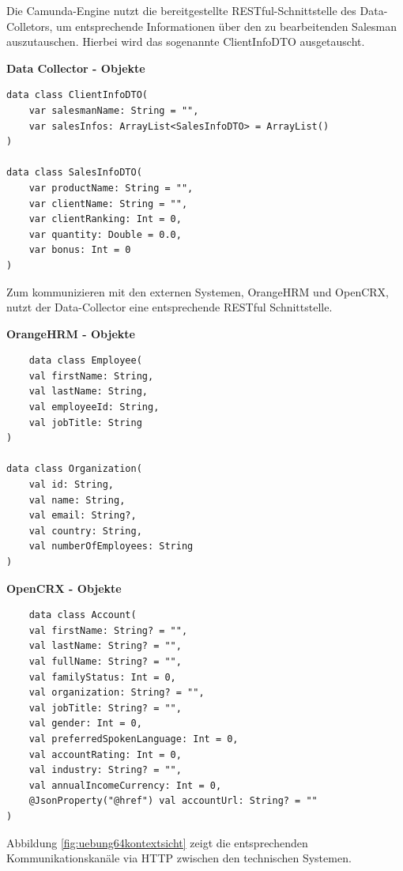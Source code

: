 \documentclass[]{article}
\begin{document}
Die Camunda-Engine nutzt die bereitgestellte RESTful-Schnittstelle des Data-Colletors, um entsprechende Informationen über den zu bearbeitenden Salesman auszutauschen.
Hierbei wird das sogenannte ClientInfoDTO ausgetauscht.

\textbf{Data Collector - Objekte}
\begin{verbatim}
data class ClientInfoDTO(
    var salesmanName: String = "",
    var salesInfos: ArrayList<SalesInfoDTO> = ArrayList()
)

data class SalesInfoDTO(
    var productName: String = "",
    var clientName: String = "",
    var clientRanking: Int = 0,
    var quantity: Double = 0.0,
    var bonus: Int = 0
)
\end{verbatim}

Zum kommunizieren mit den externen Systemen, OrangeHRM und OpenCRX, nutzt der Data-Collector eine entsprechende RESTful Schnittstelle.

\textbf{OrangeHRM - Objekte}
\begin{verbatim}
	data class Employee(
    val firstName: String,
    val lastName: String,
    val employeeId: String,
    val jobTitle: String
)

data class Organization(
    val id: String,
    val name: String,
    val email: String?,
    val country: String,
    val numberOfEmployees: String
)
\end{verbatim}

\textbf{OpenCRX - Objekte}
\begin{verbatim}
	data class Account(
    val firstName: String? = "",
    val lastName: String? = "",
    val fullName: String? = "",
    val familyStatus: Int = 0,
    val organization: String? = "",
    val jobTitle: String? = "",
    val gender: Int = 0,
    val preferredSpokenLanguage: Int = 0,
    val accountRating: Int = 0,
    val industry: String? = "",
    val annualIncomeCurrency: Int = 0,
    @JsonProperty("@href") val accountUrl: String? = ""
)
\end{verbatim}

Abbildung \ref{fig:uebung64kontextsicht} zeigt die entsprechenden Kommunikationskanäle via HTTP zwischen den technischen Systemen.
\end{document}
